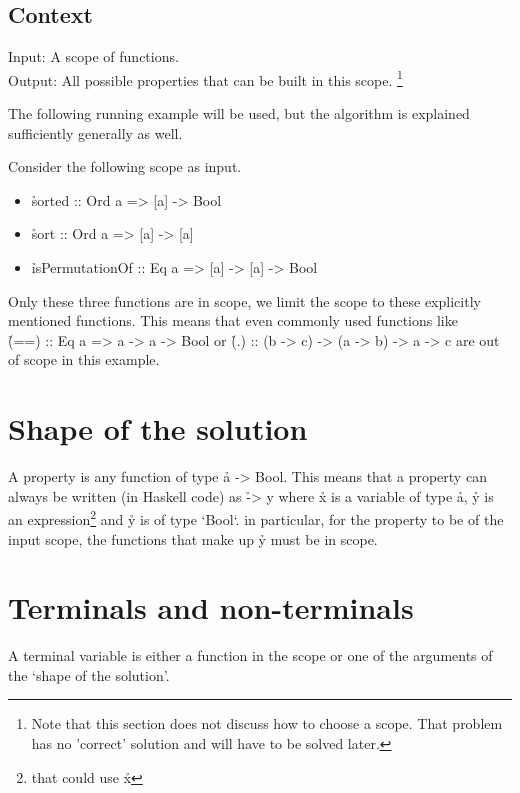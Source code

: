 \documentclass[a4paper, 11pt]{article}
\begin{document}
\subsection{Context}

Input: A scope of functions.\\
Output: All possible properties that can be built in this scope.
\footnote{
  Note that this section does not discuss how to choose a scope.
  That problem has no 'correct' solution and will have to be solved later.
}

The following running example will be used, but the algorithm is explained sufficiently generally as well.

Consider the following scope as input.

\begin{itemize}
  \item \h{sorted :: Ord a => [a] -> Bool}
  \item \h{sort :: Ord a => [a] -> [a]}
  \item \h{isPermutationOf :: Eq a => [a] -> [a] -> Bool}
\end{itemize}

Only these three functions are in scope, we limit the scope to these explicitly mentioned functions.
This means that even commonly used functions like\\ \h{(==) :: Eq a => a -> a -> Bool} or \h{(.) :: (b -> c) -> (a -> b) -> a -> c} are out of scope in this example.

\section{Shape of the solution}

A property is any function of type \h{a -> Bool}.
This means that a property can always be written (in Haskell code) as \h{\x -> y} where \h{x} is a variable of type \h{a}, \h{y} is an expression\footnote{that could use \h{x}} and \h{y} is of type `Bool`.
in particular, for the property to be of the input scope, the functions that make up \h{y} must be in scope.

\section{Terminals and non-terminals}

\begin{de}
  A terminal variable is either a function in the scope or one of the arguments of the `shape of the solution'.
\end{de}
\end{document}
